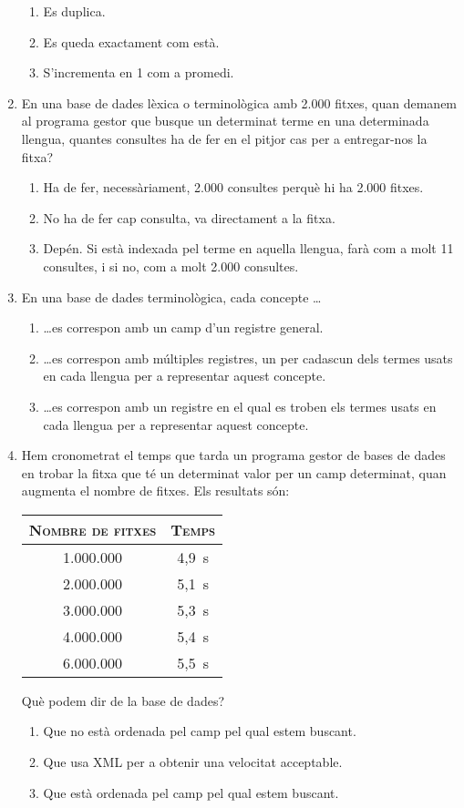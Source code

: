 \begin{enumerate}
\begin{enumerate}
\item Es duplica.
\item Es queda exactament com està.
\item S'incrementa en 1 com a promedi.
\end{enumerate}

\item En una base de dades lèxica o terminològica amb 2.000 fitxes, quan demanem al programa gestor que busque un determinat terme en una determinada llengua, quantes consultes ha de fer en el pitjor cas per a entregar-nos la fitxa?
  \begin{enumerate}
  \item Ha de fer, necessàriament, 2.000 consultes perquè hi ha 2.000 fitxes.
  \item No ha de fer cap consulta, va directament a la fitxa.
  \item Depén. Si està indexada pel terme en aquella llengua, farà com a molt 11 consultes, i si no, com a molt 2.000 consultes.
  \end{enumerate}

\item En una base de dades terminològica, cada concepte \ldots 
  \begin{enumerate}
  \item \ldots es correspon amb un camp d'un registre
      general.
  \item \ldots es correspon amb múltiples
      registres, un per cadascun dels termes usats en cada llengua per
      a representar aquest concepte.
    \item \ldots es correspon amb un registre en el qual es troben els
      termes usats en cada llengua per a representar aquest concepte.
  \end{enumerate}

\item Hem cronometrat el temps que tarda un programa gestor de bases
  de dades en trobar la fitxa que té un determinat valor per un camp
  determinat, quan augmenta el nombre de fitxes. Els resultats són:
\begin{center}
\begin{tabular}{c|c}
\hline\hline
\textsc{Nombre de fitxes} & \textsc{Temps} \\
\hline
1.000.000 & 4,9~s \\
2.000.000 & 5,1~s \\
3.000.000 & 5,3~s \\
4.000.000 & 5,4~s \\
6.000.000 & 5,5~s \\
\hline
\end{tabular}
\end{center}
Què podem dir de la base de dades?
\begin{enumerate}
\item Que no està ordenada pel camp pel qual estem buscant.
\item Que usa XML per a obtenir una velocitat acceptable.
\item Que està ordenada pel camp pel qual estem buscant.
\end{enumerate}


\end{enumerate}
